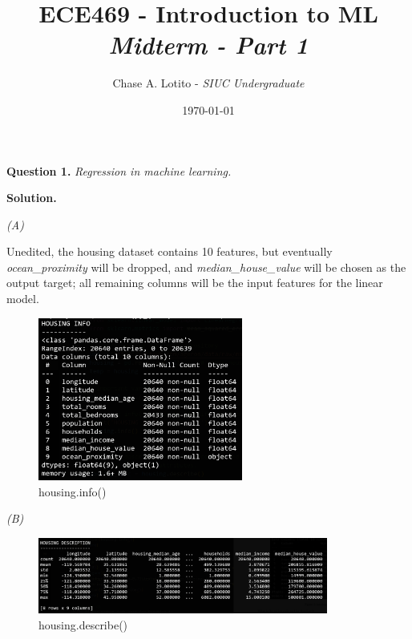 \documentclass[10pt]{article}
\title{\textbf{ECE469 - Introduction to ML} \\ \textit{Midterm - Part 1}}
\author{Chase A. Lotito - \textit{SIUC Undergraduate}}
\date{\today}
\begin{document}

\maketitle


\textbf{Question 1.} \textit{Regression in machine learning.}

\bigskip
\textbf{Solution.}

\smallskip
\textit{(A)}

\smallskip
Unedited, the housing dataset contains 10 features, but eventually \textit{ocean\_proximity} will be dropped, and \textit{median\_house\_value} will be chosen as the output target; all remaining columns will be the input features for the linear model.

\begin{figure}[h]
    \includegraphics[width=0.6\textwidth]{../logs/housing_info.png}
    \centering
    \caption{housing.info()}
\end{figure}

\smallskip
\textit{(B)}
\begin{figure}[h]
    \includegraphics[width=0.85\textwidth]{../logs/housing_desc.png}
    \centering
    \caption{housing.describe()}
\end{figure}

\clearpage
\end{document}
